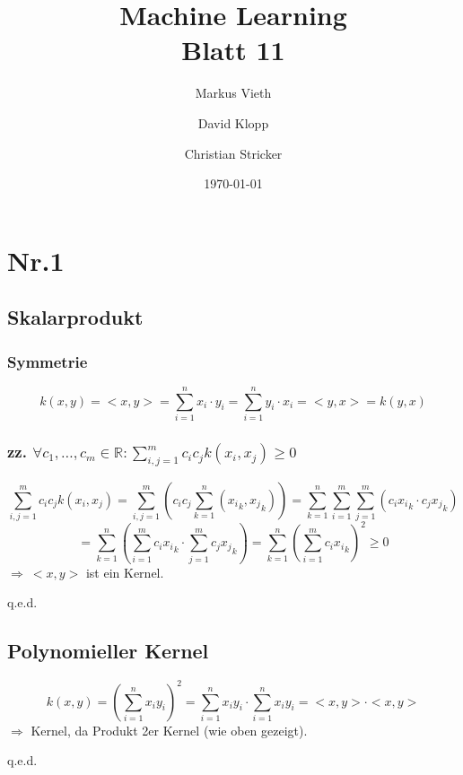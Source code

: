 \documentclass[a4paper,11pt,twoside]{scrartcl}
\title{Machine Learning\\ Blatt 11}
\author{Markus Vieth\and David Klopp\and Christian Stricker}
\date{\today}
\begin{document}
\newcommand{\cor}[1]{\textcolor{red}{\textit{#1}}}
\maketitle
\cleardoublepage
\pagestyle{myheadings}

\newpage

\section*{Nr.1}
\subsection*{Skalarprodukt}
\subsubsection*{Symmetrie}
\[ k(x,y) = <x,y> = \sum_{i=1}^{n} x_i\cdot y_i = \sum_{i=1}^{n} y_i\cdot x_i = <y,x> = k(y,x) \]
\subsubsection*{zz. $\forall c_1, \ldots, c_m \in \mathbb{R}: \sum_{i,j = 1}^m c_ic_jk(x_i, x_j) \ge 0$}
\[ \sum_{i,j = 1}^{m} c_i c_j k(x_i, x_j) = \sum_{i,j = 1}^{m} \left( c_ic_j\sum_{k=1}^{n} ({x_i}_k, {x_j}_k) \right) = \sum_{k = 1}^{n}\sum_{i=1}^{m}\sum_{j=1}^{m}(c_i{x_i}_k \cdot c_j{x_j}_k)  \]
\[ = \sum_{k=1}^{n}\left( \sum_{i=1}^{m} c_i{x_i}_k \cdot \sum_{j=1}^{m}c_j{x_j}_k \right) = \sum_{k=1}^{n}\left( \sum_{i=1}^{m}c_i{x_i}_k \right)^2 \ge 0 \]
$\Rightarrow ~ <x,y>$ ist ein Kernel.
\begin{flushright}
	q.e.d.
	\end{flushright}
\subsection*{Polynomieller Kernel}
\[ k(x, y) = (\sum_{i=1}^n x_i y_i)^2 = \sum_{i=1}^n x_i y_i \cdot \sum_{i=1}^n x_i y_i = <x,y> \cdot <x,y> \]
$\Rightarrow$ Kernel, da Produkt 2er Kernel (wie oben gezeigt).
\begin{flushright}
	q.e.d.
\end{flushright}
\end{document}
